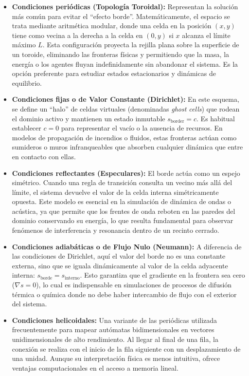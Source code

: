 \documentclass[runningheads]{llncs}
\begin{document}
\begin{itemize}
    \item \textbf{Condiciones periódicas (Topología Toroidal):} Representan la solución más común para evitar el ``efecto borde''. Matemáticamente, el espacio se trata mediante aritmética modular, donde una celda en la posición $(x, y)$ tiene como vecina a la derecha a la celda en $(0, y)$ si $x$ alcanza el límite máximo $L$. Esta configuración proyecta la rejilla plana sobre la superficie de un toroide, eliminando las fronteras físicas y permitiendo que la masa, la energía o los agentes fluyan indefinidamente sin abandonar el sistema. Es la opción preferente para estudiar estados estacionarios y dinámicas de equilibrio.
    \item \textbf{Condiciones fijas o de Valor Constante (Dirichlet):} En este esquema, se define un ``halo'' de celdas virtuales (denominadas \textit{ghost cells}) que rodean el dominio activo y mantienen un estado inmutable $s_{\text{border}} = c$. Es habitual establecer $c=0$ para representar el vacío o la ausencia de recursos. En modelos de propagación de incendios o fluidos, estas fronteras actúan como sumideros o muros infranqueables que absorben cualquier dinámica que entre en contacto con ellas.
    \item \textbf{Condiciones reflectantes (Especulares):} El borde actúa como un espejo simétrico. Cuando una regla de transición consulta un vecino más allá del límite, el sistema devuelve el valor de la celda interna simétricamente opuesta. Este modelo es esencial en la simulación de dinámica de ondas o acústica, ya que permite que los frentes de onda reboten en las paredes del dominio conservando su energía, lo que resulta fundamental para observar fenómenos de interferencia y resonancia dentro de un recinto cerrado.
    \item \textbf{Condiciones adiabáticas o de Flujo Nulo (Neumann):} A diferencia de las condiciones de Dirichlet, aquí el valor del borde no es una constante externa, sino que se iguala dinámicamente al valor de la celda adyacente interna: $s_{\text{borde}} = s_{\text{interno}}$. Esto garantiza que el gradiente en la frontera sea cero ($\nabla s = 0$), lo cual es indispensable en simulaciones de procesos de difusión térmica o química donde no debe haber intercambio de flujo con el exterior del sistema.
    \item \textbf{Condiciones helicoidales:} Una variante de las periódicas utilizada frecuentemente para mapear autómatas bidimensionales en vectores unidimensionales de alto rendimiento. Al llegar al final de una fila, la conexión se realiza con el inicio de la fila siguiente con un desplazamiento de una unidad. Aunque su interpretación física es menos intuitiva, ofrece ventajas computacionales en el acceso a memoria lineal.
\end{itemize}
\end{document}
